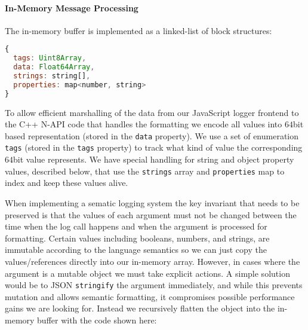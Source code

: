 \paragraph{In-Memory Message Processing}
\noindent
The in-memory buffer is implemented as a linked-list of block structures:
\begin{lstlisting}[language=JavaScript,basicstyle=\scriptsize]
{
  tags: Uint8Array,
  data: Float64Array,
  strings: string[],
  properties: map<number, string>
}
\end{lstlisting}

To allow efficient marshalling of the data from our JavaScript logger frontend 
to the C++ N-API code that handles the formatting we encode all values into 
$64$bit based representation (stored in the \texttt{data} property). We use a set 
of enumeration \texttt{tags} (stored in the \texttt{tags} property) to track 
what kind of value the corresponding $64$bit value represents. We have special 
handling for string and object property values, described below, that use the 
\texttt{strings} array and \texttt{properties} map to index and keep these values alive.

When implementing a sematic logging system the key invariant that needs to be 
preserved is that the values of each argument must not be changed between the 
time when the log call happens and when the argument is processed for 
formatting. Certain values including booleans, numbers, and strings, are 
immutable according to the language semantics so we can just copy the 
values/references directly into our in-memory array. However, in cases where the 
argument is a mutable object we must take explicit actions. A simple solution 
would be to JSON \texttt{stringify} the argument immediately, and while this 
prevents mutation and allows semantic formatting, it compromises possible 
performance gains we are looking for. Instead we recursively flatten the object 
into the in-memory buffer with the code shown here:



